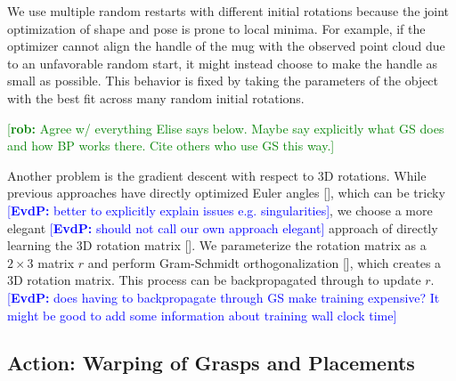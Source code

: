 \documentclass{article}
\newcommand{\evdp}[1]{\textcolor{blue}{[\textbf{EvdP:} #1]}}
\newcommand{\rob}[1]{\textcolor{green}{[\textbf{rob:} #1]}}
\begin{document}
We use multiple random restarts with different initial rotations because the joint optimization of shape and pose is prone to local minima. For example, if the optimizer cannot align the handle of the mug with the observed point cloud due to an unfavorable random start, it might instead choose to make the handle as small as possible. This behavior is fixed by taking the parameters of the object with the best fit across many random initial rotations.

\rob{Agree w/ everything Elise says below. Maybe say explicitly what GS does and how BP works there. Cite others who use GS this way.}

Another problem is the gradient descent with respect to 3D rotations. While previous approaches have directly optimized Euler angles [], which can be tricky \evdp{better to explicitly explain issues e.g. singularities}, we choose a more elegant \evdp{should not call our own approach elegant} approach of directly learning the 3D rotation matrix []. We parameterize the rotation matrix as a $2{\times}3$ matrix $r$ and perform Gram-Schmidt orthogonalization [], which creates a 3D rotation matrix. This process can be backpropagated through to update $r$. \evdp{does having to backpropagate through GS make training expensive? It might be good to add some information about training wall clock time}

\subsection{Action: Warping of Grasps and Placements}
\label{sec:methods:cloning}
\end{document}
